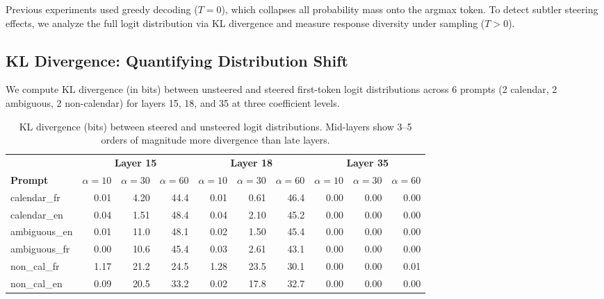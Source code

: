 \documentclass[11pt,a4paper]{article}
\begin{document}
Previous experiments used greedy decoding ($T{=}0$), which collapses all probability mass onto the argmax token. To detect subtler steering effects, we analyze the full logit distribution via KL divergence and measure response diversity under sampling ($T>0$).

\subsection{KL Divergence: Quantifying Distribution Shift}

We compute KL divergence (in bits) between unsteered and steered first-token logit distributions across 6 prompts (2 calendar, 2 ambiguous, 2 non-calendar) for layers 15, 18, and 35 at three coefficient levels.

\begin{table}[H]
\centering
\caption{KL divergence (bits) between steered and unsteered logit distributions. Mid-layers show 3--5 orders of magnitude more divergence than late layers.}
\label{tab:kl_divergence}
\begin{tabular}{l|rrr|rrr|rrr}
\toprule
& \multicolumn{3}{c|}{\textbf{Layer 15}} & \multicolumn{3}{c|}{\textbf{Layer 18}} & \multicolumn{3}{c}{\textbf{Layer 35}} \\
\textbf{Prompt} & $\alpha{=}10$ & $\alpha{=}30$ & $\alpha{=}60$ & $\alpha{=}10$ & $\alpha{=}30$ & $\alpha{=}60$ & $\alpha{=}10$ & $\alpha{=}30$ & $\alpha{=}60$ \\
\midrule
calendar\_fr & 0.01 & 4.20 & 44.4 & 0.01 & 0.61 & 46.4 & 0.00 & 0.00 & 0.00 \\
calendar\_en & 0.04 & 1.51 & 48.4 & 0.04 & 2.10 & 45.2 & 0.00 & 0.00 & 0.00 \\
ambiguous\_en & 0.01 & 11.0 & 48.1 & 0.02 & 1.50 & 45.4 & 0.00 & 0.00 & 0.00 \\
ambiguous\_fr & 0.00 & 10.6 & 45.4 & 0.03 & 2.61 & 43.1 & 0.00 & 0.00 & 0.00 \\
non\_cal\_fr & 1.17 & 21.2 & 24.5 & 1.28 & 23.5 & 30.1 & 0.00 & 0.00 & 0.01 \\
non\_cal\_en & 0.09 & 20.5 & 33.2 & 0.02 & 17.8 & 32.7 & 0.00 & 0.00 & 0.00 \\
\bottomrule
\end{tabular}
\end{table}
\end{document}

